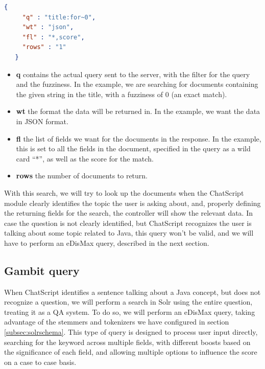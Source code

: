 \begin{center} 
  \begin{lstlisting}[language=json, caption=Example JSON query for Solr, label=listing:solrquery1]
   {
     "q" : "title:for~0",
     "wt" : "json",
     "fl" : "*,score",
     "rows" : "1"
   }  
  \end{lstlisting}
\end{center}

\begin{itemize}
 \item \textbf{q} contains the actual query sent to the server, with the filter for the query and the fuzziness. In the example, we are searching for documents containing the given string in the title, with a fuzziness of 0 (an exact match).
 \item \textbf{wt} the format the data will be returned in. In the example, we want the data in JSON format.
 \item \textbf{fl} the list of fields we want for the documents in the response. In the example, this is set to all the fields in the document, specified in the query as a wild card ``*'', as well as the score for the match.
 \item \textbf{rows} the number of documents to return.
\end{itemize}

With this search, we will try to look up the documents when the ChatScript module clearly identifies the topic the user is asking about, and, properly defining the returning fields for the search, the controller will show the relevant data. In case the question is not clearly identified, but ChatScript recognizes the user is talking about some topic related to Java, this query won't be valid, and we will have to perform an \ac{eDisMax} query, described in the next section.

\subsection{Gambit query}
\label{subsec:solrgambit}

When ChatScript identifies a sentence talking about a Java concept, but does not recognize a question, we will perform a search in Solr using the entire question, treating it as a \ac{QA} system. To do so, we will perform an \ac{eDisMax} query, taking advantage of the stemmers and tokenizers we have configured in section \ref{subsec:solrschema}. This type of query is designed to process user input directly, searching for the keyword across multiple fields, with different boosts based on the significance of each field, and allowing multiple options to influence the score on a case to case basis.

